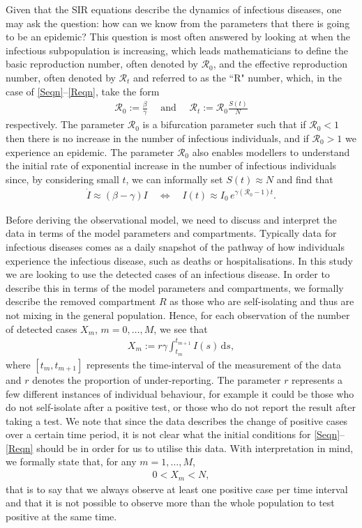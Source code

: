 \documentclass{article}
\newcommand{\ds}{\text{d}s}
\newcommand{\Rn}{\mathcal{R}_0}
\newcommand{\Rt}{\mathcal{R}_t}
\begin{document}
Given that the SIR equations describe the dynamics of infectious diseases, one may ask the question: how can we know from the parameters that there is going to be an epidemic? This question is most often answered by looking at when the infectious subpopulation is increasing, which leads mathematicians to define the basic reproduction number, often denoted by $\Rn$, and the effective reproduction number, often denoted by $\Rt$ and referred to as the ``R" number, which, in the case of \eqref{Seqn}--\eqref{Reqn}, take the form
%
\begin{align*}
    \Rn := \frac{\beta}{\gamma} \quad \text{ and } \quad \Rt := \mathcal{R}_0 \frac{S(t)}{N} %
\end{align*}
%
respectively. The parameter $\Rn$ is a bifurcation parameter such that if $\Rn < 1$ then there is no increase in the number of infectious individuals, and if $\Rn > 1$ we experience an epidemic. The parameter $\Rn$ also enables modellers to understand the initial rate of exponential increase in the number of infectious individuals since, by considering small $t$, we can informally set $S(t) \approx N$ and find that
%
\begin{align*}
    \dot{I} \approx (\beta - \gamma) I \quad \Longleftrightarrow \quad I(t) \approx I_0 \, e^{\gamma(\Rn - 1)t}. %
\end{align*}

Before deriving the observational model, we need to discuss and interpret the data in terms of the model parameters and compartments. Typically data for infectious diseases comes as a daily snapshot of the pathway of how individuals experience the infectious disease, such as deaths or hospitalisations. In this study we are looking to use the detected cases of an infectious disease. In order to describe this in terms of the model parameters and compartments, we formally describe the removed compartment $R$ as those who are self-isolating and thus are not mixing in the general population. Hence, for each observation of the number of detected cases $X_m$, $m = 0, \dots, M$, we see that
%
\begin{align}
    X_m := r \gamma \int_{t_m}^{t_{m+1}} I(s) \, \ds, \label{data}
\end{align}
%
where $[t_m,t_{m+1}]$ represents the time-interval of the measurement of the data and $r$ denotes the proportion of under-reporting. The parameter $r$ represents a few different instances of individual behaviour, for example it could be those who do not self-isolate after a positive test, or those who do not report the result after taking a test. We note that since the data describes the change of positive cases over a certain time period, it is not clear what the initial conditions for \eqref{Seqn}--\eqref{Reqn} should be in order for us to utilise this data. With interpretation in mind, we formally state that, for any $m = 1,\dots,M$,
%
\begin{align*}
    0 < X_m < N,
\end{align*}
%
that is to say that we always observe at least one positive case per time interval and that it is not possible to observe more than the whole population to test positive at the same time. 
\end{document}

